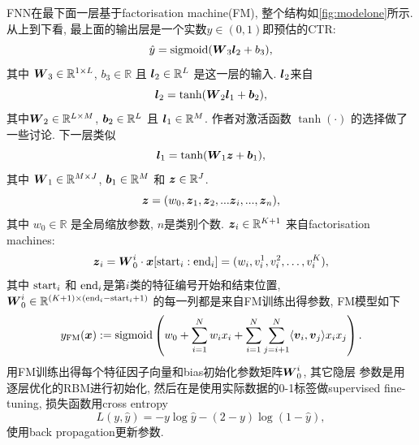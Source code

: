 \documentclass{ctexart}
\begin{document}
FNN在最下面一层基于factorisation machine(FM)\cite{rendle2012factorization},
整个结构如\autoref{fig:modelone}所示.
从上到下看, 最上面的输出层是一个实数\(\hat{y} \in (0,1)\)即预估的CTR:
\begin{equation}
  \hat{y} =\operatorname*{sigmoid}(\boldsymbol{W}_{3}\boldsymbol{l}_{2}+b_{3}),   \label{eq:xdef1}
\end{equation}
其中 $\boldsymbol{W}_{3}\in\mathbb{R}^{1 \times L}$, $b_{3}\in \mathbb{R}$ 且 $\boldsymbol{l}_{2} \in \mathbb{R}^{L}$
是这一层的输入. $\boldsymbol{l}_{2}$来自
\begin{equation}
  \boldsymbol{l}_{2}=\text{tanh}(\boldsymbol{W}_{2}\boldsymbol{l}_{1}+\boldsymbol{b}_{2}),   \label{eq:xdef2}
\end{equation}
其中$\boldsymbol{W}_{2}\in\mathbb{R}^{L\times M}$, $\boldsymbol{b}_{2}\in \mathbb{R}^{L}$ 且 $\boldsymbol{l}_{1} \in \mathbb{R}^{M}$.
作者对激活函数 $\tanh(\cdot)$ 的选择做了一些讨论. 下一层类似
\begin{equation}
  \boldsymbol{l}_{1}=\text{tanh}(\boldsymbol{W}_{1}\boldsymbol{z}+\boldsymbol{b}_{1}),   \label{eq:xdef3}
\end{equation}
其中 $\boldsymbol{W}_{1}\in\mathbb{R}^{M\times J}$, $\boldsymbol{b}_{1}\in \mathbb{R}^{M}$ 和 $\boldsymbol{z} \in \mathbb{R}^{J}$.
\begin{equation}
  \boldsymbol{z}=(w_{0}, \boldsymbol{z}_{1}, \boldsymbol{z}_{2}, ...\boldsymbol{z}_{i}, ..., \boldsymbol{z}_{n}),
  \label{eq:xdef4}
\end{equation}
其中 $w_{0} \in \mathbb{R}$ 是全局缩放参数, $n$是类别个数.
$\boldsymbol{z}_{i} \in\mathbb{R}^{K+1}$ 来自factorisation machines:
\begin{equation}
  \boldsymbol{z}_{i}=\boldsymbol{W}_{0}^{i}\cdot \boldsymbol{x}[\text{start}_{i}:\text{end}_{i}] = (w_i, v_i^1, v_i^2, \ldots, v_i^K),
  \label{eq:xdef5}
\end{equation}
其中 $\text{start}_{i}$ 和 $\text{end}_{i}$是第$i$类的特征编号开始和结束位置,
$\boldsymbol{W}_{0}^{i} \in \mathbb{R}^{(K+1) \times (\text{end}_{i}-\text{start}_{i}+1)} $
的每一列都是来自FM训练出得参数, FM模型如下
\begin{equation}
   y_{\text{FM}}(\boldsymbol{x}):=\operatorname*{sigmoid} \left( w_{0}+\sum_{i=1}^{N} w_{i} x_{i}
   +\sum_{i=1}^{N}\sum_{j=i+1}^{N}\langle\boldsymbol{v}_{i},\boldsymbol{v}_{j}\rangle x_{i}
   x_{j} \right).
   \label{eq:xdef}
\end{equation}
用FM训练出得每个特征因子向量和bias初始化参数矩阵\(\boldsymbol{W}_{0}^i\), 其它隐层
参数是用逐层优化的RBM进行初始化\cite{bengio2007greedy},
然后在是使用实际数据的0-1标签做supervised fine-tuning,
损失函数用cross entropy
\begin{equation}
  L(y,\hat{y})= -y\log \hat{y} - (2-y)\log(1-\hat{y}), \label{eq:xdefloss}
\end{equation}
使用back propagation更新参数.
\end{document}
